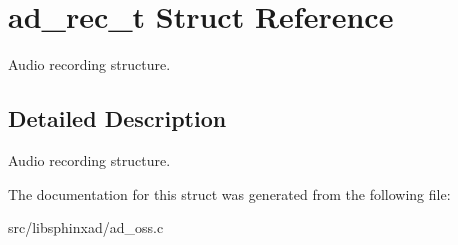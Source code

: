 \section{ad\-\_\-rec\-\_\-t Struct Reference}
\label{structad__rec__t}


Audio recording structure.  




\subsection{Detailed Description}
Audio recording structure. 

The documentation for this struct was generated from the following file\-:\begin{DoxyCompactItemize}
\item 
src/libsphinxad/ad\-\_\-oss.\-c\end{DoxyCompactItemize}
